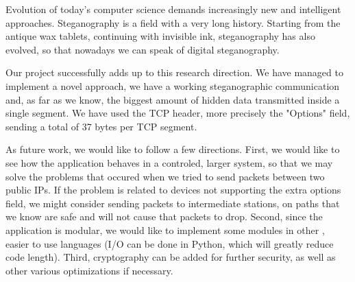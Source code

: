 
Evolution of today's computer science demands increasingly new and intelligent
approaches. Steganography is a field with a very long history. Starting from
the antique wax tablets, continuing with invisible ink, steganography has also
evolved, so that nowadays we can speak of digital steganography.

Our project successfully adds up to this research direction. We have managed to
implement a novel approach, we have a working steganographic communication and,
as far as we know, the biggest amount of hidden data transmitted inside a
single segment. We have used the TCP header, more precisely the "Options"
field, sending a total of 37 bytes per TCP segment.

As future work, we would like to follow a few directions. First, we would like to
see how the application behaves in a controled, larger system, so that we may solve
the problems that occured when we tried to send packets between two public IPs. If
the problem is related to devices not supporting the extra options field, we might 
consider sending packets to intermediate stations, on paths that we know are safe
and will not cause that packets to drop. Second, since the application is modular,
we would like to implement some modules in other , easier to use languages (I/O 
can be done in Python, which will greatly reduce code length). Third, cryptography
can be added for further security, as well as other various optimizations if 
necessary.

